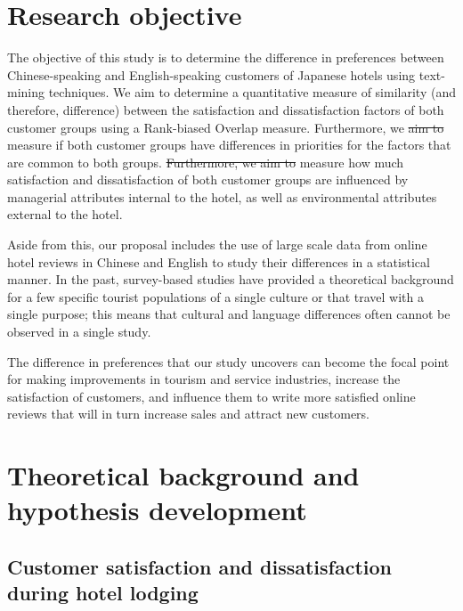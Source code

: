 \documentclass[review]{elsarticle}
\providecommand{\DIFadd}[1]{{\protect\color{blue}\uwave{#1}}} %
\providecommand{\DIFdel}[1]{{\protect\color{red}\sout{#1}}}                      %
\providecommand{\DIFaddbegin}{} %
\providecommand{\DIFaddend}{} %
\providecommand{\DIFdelbegin}{} %
\providecommand{\DIFdelend}{} %
\newcommand{\DIFscaledelfig}{0.5}
\newlength{\DIFdelgraphicswidth} %
\newlength{\DIFdelgraphicsheight} %
\newcommand{\DIFaddincludegraphics}[2][]{{\color{blue}\fbox{\DIFOincludegraphics[#1]{#2}}}} %
\newcommand{\DIFdelincludegraphics}[2][]{%
\sbox{\DIFdelgraphicsbox}{\DIFOincludegraphics[#1]{#2}}%
\settoboxwidth{\DIFdelgraphicswidth}{\DIFdelgraphicsbox} %
\settoboxtotalheight{\DIFdelgraphicsheight}{\DIFdelgraphicsbox} %
\scalebox{\DIFscaledelfig}{%
\parbox[b]{\DIFdelgraphicswidth}{\usebox{\DIFdelgraphicsbox}\\[-\baselineskip] \rule{\DIFdelgraphicswidth}{0em}}\llap{\resizebox{\DIFdelgraphicswidth}{\DIFdelgraphicsheight}{%
\setlength{\unitlength}{\DIFdelgraphicswidth}%
\begin{picture}(1,1)%
\thicklines\linethickness{2pt} %
{\color[rgb]{1,0,0}\put(0,0){\framebox(1,1){}}}%
{\color[rgb]{1,0,0}\put(0,0){\line( 1,1){1}}}%
{\color[rgb]{1,0,0}\put(0,1){\line(1,-1){1}}}%
\end{picture}%
}\hspace*{3pt}}} %
} %
\DeclareRobustCommand{\DIFaddbegin}{\DIFOaddbegin \let\includegraphics\DIFaddincludegraphics} %
\DeclareRobustCommand{\DIFaddend}{\DIFOaddend \let\includegraphics\DIFOincludegraphics} %
\DeclareRobustCommand{\DIFdelbegin}{\DIFOdelbegin \let\includegraphics\DIFdelincludegraphics} %
\DeclareRobustCommand{\DIFdelend}{\DIFOaddend \let\includegraphics\DIFOincludegraphics} %
\begin{document}
\section{Research objective}\label{research_objective}

The objective of this study is to determine the difference in preferences between Chinese-speaking and English-speaking customers of Japanese hotels using text-mining techniques. We aim to determine a quantitative measure of similarity (and therefore, difference) between the satisfaction and dissatisfaction factors of both customer groups using a Rank-biased Overlap measure. Furthermore, we \DIFdelbegin \DIFdel{aim to }\DIFdelend \DIFaddbegin \DIFadd{will }\DIFaddend measure if both customer groups have differences in priorities for the factors that are common to both groups. \DIFdelbegin \DIFdel{Furthermore, we aim to }\DIFdelend \DIFaddbegin \DIFadd{In addition, we also }\DIFaddend measure how much satisfaction and dissatisfaction of both customer groups are influenced by managerial attributes internal to the hotel, as well as environmental attributes external to the hotel. 

Aside from this, our proposal includes the use of large scale data from online hotel reviews in Chinese and English to study their differences in a statistical manner. In the past, survey-based studies have provided a theoretical background for a few specific tourist populations of a single culture or that travel with a single purpose; this means that cultural and language differences often cannot be observed in a single study. 

The difference in preferences that our study uncovers can become the focal point for making improvements in tourism and service industries, increase the satisfaction of customers, and influence them to write more satisfied online reviews that will in turn increase sales and attract new customers. 

\section{Theoretical background and hypothesis development}\label{theory_hypothesis}

\subsection{Customer satisfaction and dissatisfaction during hotel lodging}\label{theory_satisfaction}
\end{document}
